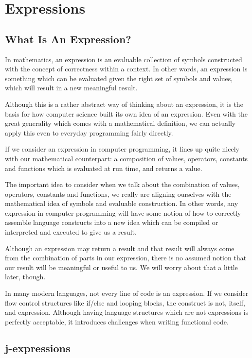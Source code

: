 \documentclass[a4paper,12pt,twoside]{book}
\begin{document}
\chapter{Expressions}
\section{What Is An Expression?}
 
 In mathematics, an expression is an evaluable collection of symbols constructed with the concept of correctness within a context.  In other words, an expression is something which can be evaluated given the right set of symbols and values, which will result in a new meaningful result.
 
 Although this is a rather abstract way of thinking about an expression, it is the basis for how computer science built its own idea of an expression.  Even with the great generality which comes with a mathematical definition, we can actually apply this even to everyday programming fairly directly.
 
 If we consider an expression in computer programming, it lines up quite nicely with our mathematical counterpart: a composition of values, operators, constants and functions which is evaluated at run time, and returns a value.
 
 The important idea to consider when we talk about the combination of values, operators, constants and functions, we really are aligning ourselves with the mathematical idea of symbols and evaluable construction.  In other words, any expression in computer programming will have some notion of how to correctly assemble language constructs into a new idea which can be compiled or interpreted and executed to give us a result.
 
 Although an expression may return a result and that result will always come from the combination of parts in our expression, there is no assumed notion that our result will be meaningful or useful to us.  We will worry about that a little later, though.
 
 In many modern languages, not every line of code is an expression.  If we consider flow control structures like if/else and looping blocks, the construct is not, itself, and expression.  Although having language structures which are not expressions is perfectly acceptable, it introduces challenges when writing functional code.
 
\section{j-expressions}
 
\end{document}
